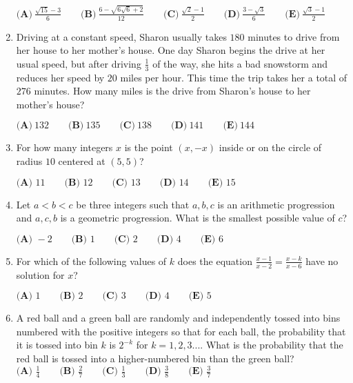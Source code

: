 \documentclass{article}%
\begin{document}
\begin{enumerate}
$\textbf{(A)}\ \frac{\sqrt{15}-3}{6} \qquad \textbf{(B)}\ \frac{6-\sqrt{6\sqrt{6}+2}}{12} \qquad \textbf{(C)}\ \frac{\sqrt{2}-1}{2} \qquad \textbf{(D)}\ \frac{3-\sqrt{3}}{6} \qquad \textbf{(E)}\ \frac{\sqrt{3}-1}{2}$

%
\item%
Driving at a constant speed, Sharon usually takes $180$ minutes to drive from her house to her mother's house. One day Sharon begins the drive at her usual speed, but after driving $\frac{1}{3}$ of the way, she hits a bad snowstorm and reduces her speed by $20$ miles per hour. This time the trip takes her a total of $276$ minutes. How many miles is the drive from Sharon's house to her mother's house?

$\textbf{(A)}\ 132 \qquad\textbf{(B)}\ 135 \qquad\textbf{(C)}\ 138 \qquad\textbf{(D)}\ 141 \qquad\textbf{(E)}\ 144$

%
\item%
For how many integers $x$ is the point $(x, -x)$ inside or on the circle of radius $10$ centered at $(5, 5)$?

$\textbf{(A) }11\qquad \textbf{(B) }12\qquad \textbf{(C) }13\qquad \textbf{(D) }14\qquad \textbf{(E) }15$

%
\item%
Let $a<b<c$ be three integers such that $a,b,c$ is an arithmetic progression and $a,c,b$ is a geometric progression.  What is the smallest possible value of $c$?

$\textbf{(A) }-2\qquad \textbf{(B) }1\qquad \textbf{(C) }2\qquad \textbf{(D) }4\qquad \textbf{(E) }6\qquad$

%
\item%
For which of the following values of $k$ does the equation $\frac{x-1}{x-2} = \frac{x-k}{x-6}$ have no solution for $x$?

$\textbf{(A) } 1\qquad \textbf{(B) } 2\qquad \textbf{(C) } 3\qquad \textbf{(D) } 4\qquad \textbf{(E) } 5$



%
\item%
A red ball and a green ball are randomly and independently tossed into bins numbered with the positive integers so that for each ball, the probability that it is tossed into bin $k$ is $2^{-k}$ for $k = 1,2,3....$  What is the probability that the red ball is tossed into a higher-numbered bin than the green ball?
$\textbf{(A) } \frac{1}{4} \qquad\textbf{(B) } \frac{2}{7} \qquad\textbf{(C) } \frac{1}{3} \qquad\textbf{(D) } \frac{3}{8} \qquad\textbf{(E) } \frac{3}{7}$


\end{enumerate}
\end{document}
